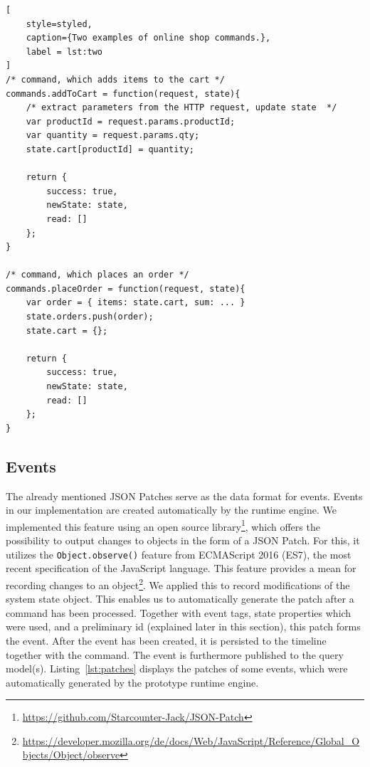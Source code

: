 \begin{lstlisting}[
	style=styled, 
	caption={Two examples of online shop commands.},
	label = lst:two
]
/* command, which adds items to the cart */
commands.addToCart = function(request, state){
	/* extract parameters from the HTTP request, update state  */
	var productId = request.params.productId;
	var quantity = request.params.qty;
	state.cart[productId] = quantity;

	return {
		success: true,
		newState: state,
		read: []
	};
}

/* command, which places an order */
commands.placeOrder = function(request, state){
	var order = { items: state.cart, sum: ... }
	state.orders.push(order);
	state.cart = {};

	return {
		success: true,
		newState: state,
		read: []
	};
}
\end{lstlisting}

\subsection{Events}
The already mentioned JSON Patches serve as the data format for events.
Events in our implementation are created automatically by the runtime engine.
We implemented this feature using an open source library\footnote[1]{\href{https://github.com/Starcounter-Jack/JSON-Patch}{https://github.com/Starcounter-Jack/JSON-Patch}},
which offers the possibility to output changes to objects in the form of a 
JSON Patch. For this, it utilizes the \mbox{\texttt{Object.observe()}} feature 
from ECMAScript 2016 (ES7), the most recent specification of the JavaScript 
language. This feature provides a mean for recording changes to an 
object\footnote[2]{\href{https://developer.mozilla.org/de/docs/Web/JavaScript/Reference/Global_Objects/Object/observe}{https://developer.mozilla.org/de/docs/Web/JavaScript/Reference/Global\_Objects/Object/observe}}.
We applied this to record modifications of the system state object.
This enables us to automatically generate the patch after a command has been 
processed. Together with event tags, state properties which were used, and a 
preliminary id (explained later in this section), this patch forms the event.
After the event has been created, it is persisted to the timeline together
with the command. The event is furthermore published to the query model(s).
%
\mbox{Listing \ref{lst:patches}} displays the patches of some events, which were
automatically generated by the prototype runtime engine.

